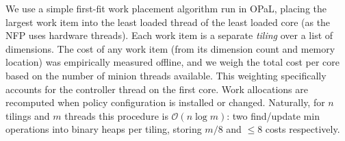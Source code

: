 \documentclass[
sigconf,natbib=false
,anonymous=true
,10pt
]{acmart}
\newcommand{\approachshort}{OPaL}
\begin{document}
We use a simple first-fit work placement algorithm run in \approachshort{}, placing the largest work item into the least loaded thread of the least loaded core (as the NFP uses hardware threads).
Each work item is a separate \emph{tiling} over a list of dimensions.
The cost of any work item (from its dimension count and memory location) was empirically measured offline, and we weigh the total cost per core based on the number of minion threads available.
This weighting specifically accounts for the controller thread on the first core.
Work allocations are recomputed when policy configuration is installed or changed.
Naturally, for $n$ tilings and $m$ threads this procedure is $\mathcal{O}{\left(n\log{m}\right)}$: two find/update min operations into binary heaps per tiling, storing $m/8$ and $\le8$ costs respectively.

%

%
%
%
\end{document}
